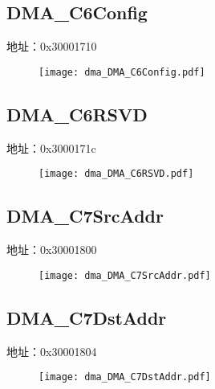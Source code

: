 \subsection{DMA\_C6Config}
\label{dma-DMA-C6Config}
地址：0x30001710
 \begin{figure}[H]
\texttt{[image: dma\_DMA\_C6Config.pdf]}
\end{figure}

\subsection{DMA\_C6RSVD}
\label{dma-DMA-C6RSVD}
地址：0x3000171c
 \begin{figure}[H]
\texttt{[image: dma\_DMA\_C6RSVD.pdf]}
\end{figure}

\subsection{DMA\_C7SrcAddr}
\label{dma-DMA-C7SrcAddr}
地址：0x30001800
 \begin{figure}[H]
\texttt{[image: dma\_DMA\_C7SrcAddr.pdf]}
\end{figure}

\subsection{DMA\_C7DstAddr}
\label{dma-DMA-C7DstAddr}
地址：0x30001804
 \begin{figure}[H]
\texttt{[image: dma\_DMA\_C7DstAddr.pdf]}
\end{figure}

